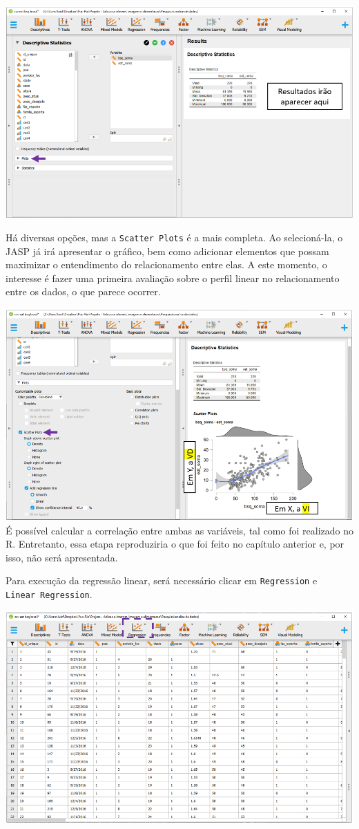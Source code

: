 \documentclass[
]{book}
\begin{document}
\includegraphics{./img/cap_reg_plot.png}

Há diversas opções, mas a \texttt{Scatter\ Plots} é a mais completa. Ao selecioná-la, o JASP já irá apresentar o gráfico, bem como adicionar elementos que possam maximizar o entendimento do relacionamento entre elas. A este momento, o interesse é fazer uma primeira avaliação sobre o perfil linear no relacionamento entre os dados, o que parece ocorrer.

\includegraphics{./img/cap_reg_plot2.png}
É possível calcular a correlação entre ambas as variáveis, tal como foi realizado no R. Entretanto, essa etapa reproduziria o que foi feito no capítulo anterior e, por isso, não será apresentada.

Para execução da regressão linear, será necessário clicar em \texttt{Regression} e \texttt{Linear\ Regression}.

\includegraphics{./img/cap_reg_multipla_interface.png}
\end{document}
